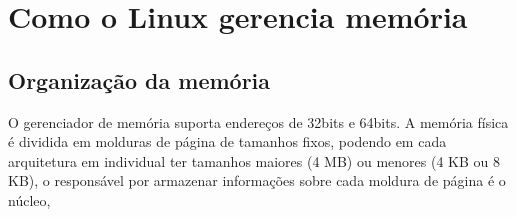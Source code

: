 \documentclass[
	12pt,				%
	oneside,   	        %
	a4paper,			%
	english,			%
	french,				%
	spanish,			%
	brazil,				%
	]{pacotes/abntex2}
\begin{document}



  
 
 


\textual

\makeatletter
\renewcommand{\chapter}{\@gobbletwo}
\makeatother

\section{\textbf{Como o Linux gerencia memória}}
\label{sec:arq-linux}

\subsection{\textbf{Organização da memória}}
\label{subsec:organizacao-memoria}

O gerenciador de memória suporta endereços de 32bits e 64bits. A memória física é dividida em molduras de página de tamanhos fixos, podendo em cada arquitetura em individual ter tamanhos maiores (4 MB) ou menores (4 KB ou 8 KB), o responsável por armazenar informações sobre cada moldura de página é o núcleo,
\end{document}
